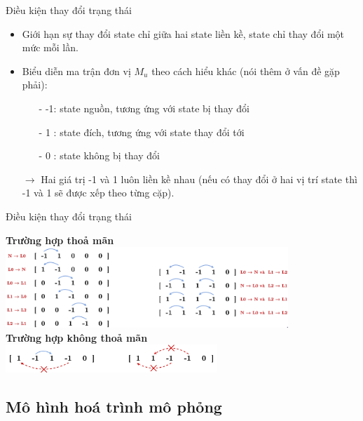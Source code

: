 \documentclass[10pt,aspectratio=169]{beamer}
\begin{document}
\begin{frame}{Điều kiện thay đổi trạng thái}{\subsecname}
\begin{itemize}
\setlength\itemsep{8pt}
\item Giới hạn sự thay đổi state chỉ giữa hai state liền kề, state chỉ thay đổi một mức mỗi lần.
\item Biểu diễn ma trận đơn vị $ M_u $ theo cách hiểu khác (nói thêm ở vấn đề gặp phải):
\begin{itemize}
\setlength\itemsep{4pt}
\item[-] -1: state nguồn, tương ứng với state bị thay đổi
\item[-] 1 : state đích, tương ứng với state thay đổi tới
\item[-] 0 : state không bị thay đổi
\end{itemize}
\item[] $ \longrightarrow $ Hai giá trị -1 và 1 luôn liền kề nhau (nếu có thay đổi ở hai vị trí state thì -1 và 1 sẽ được xếp theo từng cặp).
\end{itemize}
\end{frame}

\begin{frame}{Điều kiện thay đổi trạng thái}{\subsecname}
\begin{center}
\textbf{\small Trường hợp thoả mãn}\\
\vspace{4pt}
\includegraphics[width=0.8\textwidth]{source/1.png}\\
\vspace{8pt}
\textbf{\small Trường hợp không thoả mãn}\\
\vspace{2pt}
\includegraphics[width=0.6\textwidth]{source/2.png}\\
\end{center}
\end{frame}

\subsection{Mô hình hoá trình mô phỏng}
\end{document}
